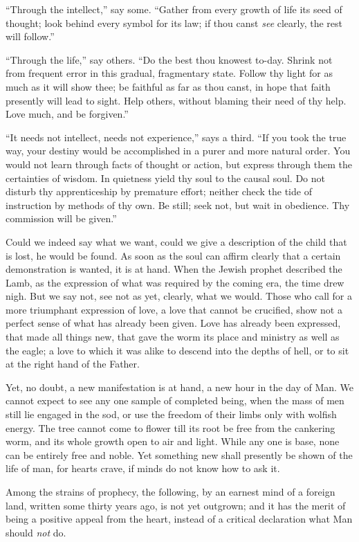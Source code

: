 ``Through the intellect,'' say some. ``Gather from every growth of
life its seed of thought; look behind every symbol for its law; if
thou canst \textit{see} clearly, the rest will follow.''

``Through the life,'' say others. ``Do the best thou knowest to-day.
Shrink not from frequent error in this gradual, fragmentary state.
Follow thy light for as much as it will show thee; be faithful as far
as thou canst, in hope that faith presently will lead to sight. Help
 others, without blaming their need of thy help. Love much,
and be forgiven.''

``It needs not intellect, needs not experience,'' says a third. ``If
you took the true way, your destiny would be accomplished in a purer
and more natural order. You would not learn through facts of thought
or action, but express through them the certainties of wisdom. In
quietness yield thy soul to the causal soul. Do not disturb thy
apprenticeship by premature effort; neither check the tide of
instruction by methods of thy own. Be still; seek not, but wait in
obedience. Thy commission will be given.''

Could we indeed say what we want, could we give a description of the
child that is lost, he would be found. As soon as the soul can affirm
clearly that a certain demonstration is wanted, it is at hand. When
the Jewish prophet described the Lamb, as the expression of what was
required by the coming era, the time drew nigh. But we say not, see
not as yet, clearly, what we would. Those who call for a more
triumphant expression of love, a love that cannot be crucified, show
not a perfect sense of what has already been given. Love has already
been expressed, that made all things new, that gave the worm its place
and ministry as well as the eagle; a love to which it was alike to
descend into the depths of hell, or to sit at the right hand of the
Father.

Yet, no doubt, a new manifestation is at hand, a new hour in the day
of Man. We cannot expect to see any one sample of completed being,
when the mass of men still lie engaged in the sod, or use the freedom
of their  limbs only with wolfish energy. The tree cannot
come to flower till its root be free from the cankering worm, and its
whole growth open to air and light. While any one is base, none can be
entirely free and noble. Yet something new shall presently be shown
of the life of man, for hearts crave, if minds do not know how to ask
it.

Among the strains of prophecy, the following, by an earnest mind of a
foreign land, written some thirty years ago, is not yet outgrown; and
it has the merit of being a positive appeal from the heart, instead of
a critical declaration what Man should \textit{not} do.

